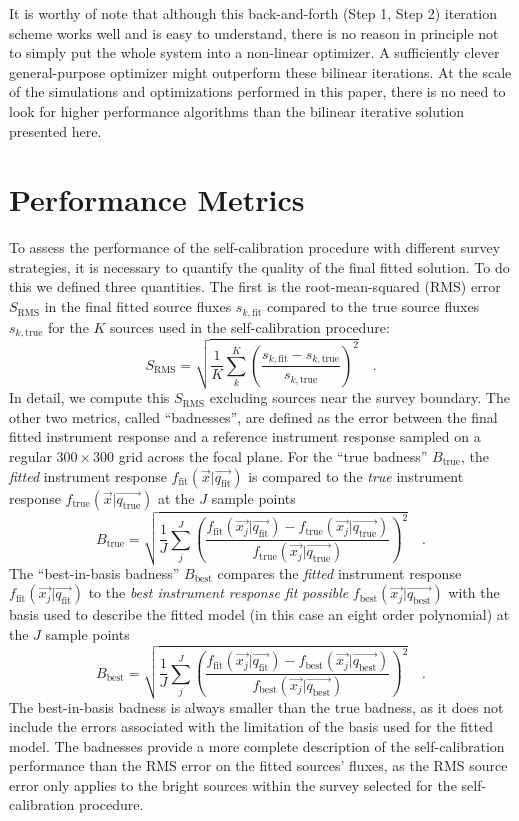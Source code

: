 \documentclass[preprint,pdftex]{aastex}
\newcommand{\true}{\text{true}}
\newcommand{\fit}{\text{fit}}
\newcommand{\basis}{\text{best}}
\newcommand{\rms}{\text{RMS}}
\begin{document}
It is worthy of note that although this back-and-forth (Step 1, Step
2) iteration scheme works well and is easy to understand, there is no
reason in principle not to simply put the whole system into a
non-linear optimizer.  A sufficiently clever general-purpose optimizer
might outperform these bilinear iterations.  At the scale of the
simulations and optimizations performed in this paper, there is no
need to look for higher performance algorithms than the bilinear
iterative solution presented here.

\section{Performance Metrics}
\label{sec:metrics}
To assess the performance of the self-calibration procedure with different survey strategies, it is necessary to quantify the quality of the final fitted solution. To do this we defined three quantities. The first is the root-mean-squared (RMS) error $S_\rms$ in the final fitted source fluxes $s_{k,\fit}$ compared to the true source fluxes $s_{k,\true}$ for the $K$ sources used in the self-calibration procedure:
\begin{equation}
S_\rms = \sqrt{\dfrac{1}{K} \sum_k^K \left( \dfrac{s_{k,\fit} - s_{k,\true}}{s_{k,\true}} \right)^2}   \quad .
\end{equation}
In detail, we compute this $S_\rms$ excluding sources near the survey boundary. The other two metrics, called ``badnesses'', are defined as the error between the final fitted instrument response and a reference instrument response sampled on a regular $300 \times 300$ grid across the focal plane. For the ``true badness'' $B_\true$, the \textit{fitted} instrument response $f_\fit(\vec{x} | \vec{q_\fit})$ is compared to the \textit{true} instrument response $f_\true(\vec{x} | \vec{q_\true})$ at the $J$ sample points  
\begin{equation}
B_\true = \sqrt{\dfrac{1}{J} \sum_j^J \left(\dfrac{f_\fit(\vec{x_j} | \vec{q_\fit}) - f_\true(\vec{x_j} | \vec{q_\true})}{f_\true(\vec{x_j} | \vec{q_\true})}\right)^2}   \quad .
\end{equation}
The ``best-in-basis badness'' $B_\basis$ compares the \textit{fitted} instrument response $f_\fit(\vec{x_j} | \vec{q_\fit})$ to the \textit{best instrument response fit possible} $f_\basis(\vec{x_j} | \vec{q_\basis})$ with the basis used to describe the fitted model (in this case an eight order polynomial) at the $J$ sample points
\begin{equation}
B_\basis = \sqrt{\dfrac{1}{J} \sum_j^J \left( \dfrac{f_\fit(\vec{x_j} | \vec{q_\fit}) - f_\basis(\vec{x_j} | \vec{q_\basis})}{f_\basis(\vec{x_j} | \vec{q_\basis})} \right)^2}   \quad .
\end{equation}
The best-in-basis badness is always smaller than the true badness, as it does not include the errors associated with the limitation of the basis used for the fitted model. The badnesses provide a more complete description of the self-calibration performance than the RMS error on the fitted sources' fluxes, as the RMS source error only applies to the bright sources within the survey selected for the self-calibration procedure.
\end{document}
